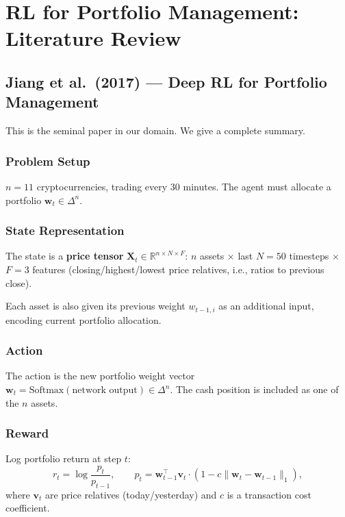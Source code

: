 \documentclass[12pt,a4paper]{article}
\begin{document}
\section{RL for Portfolio Management: Literature Review}

\subsection{Jiang et al.\ (2017) --- Deep RL for Portfolio Management}

This is the seminal paper in our domain.  We give a complete summary.

\subsubsection*{Problem Setup}

$n = 11$ cryptocurrencies, trading every 30 minutes.
The agent must allocate a portfolio $\mathbf{w}_t \in \Delta^n$.

\subsubsection*{State Representation}

The state is a \textbf{price tensor} $\mathbf{X}_t \in \mathbb{R}^{n \times N \times F}$:
$n$ assets $\times$ last $N=50$ timesteps $\times$ $F=3$ features
(closing/highest/lowest price relatives, i.e., ratios to previous close).

Each asset is also given its previous weight $w_{t-1,i}$ as an additional
input, encoding current portfolio allocation.

\subsubsection*{Action}

The action is the new portfolio weight vector
$\mathbf{w}_t = \text{Softmax}(\text{network output}) \in \Delta^n$.
The cash position is included as one of the $n$ assets.

\subsubsection*{Reward}

Log portfolio return at step $t$:
\begin{equation}
  r_t = \log \frac{p_t}{p_{t-1}}, \qquad
  p_t = \mathbf{w}_{t-1}^\top \boldsymbol{v}_t \cdot (1 - c \|\mathbf{w}_t - \mathbf{w}_{t-1}\|_1),
\end{equation}
where $\boldsymbol{v}_t$ are price relatives (today/yesterday) and $c$ is a
transaction cost coefficient.
\end{document}
